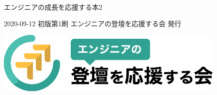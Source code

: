 \clearpage{\thispagestyle{empty}}
\begin{center}

\vspace{240pt}

\begin{sffamily}
\Huge
エンジニアの成長を応援する本2
\normalsize
\end{sffamily}
\vspace{320pt}

\begin{sffamily}
2020-09-12
\hspace{5pt}
初版第1刷
\hspace{5pt}
エンジニアの登壇を応援する会
\hspace{5pt}
発行
\end{sffamily}
\vspace{80pt}

\includegraphics[width=0.3\linewidth]{images/engineers_lt.png}

\end{center}
